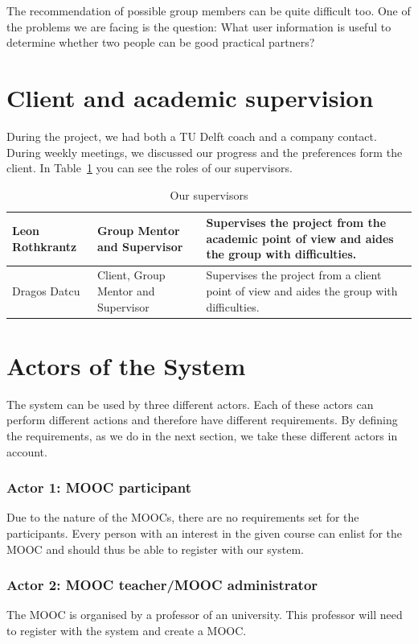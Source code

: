 The recommendation of possible group members can be quite difficult too.
One of the problems we are facing is the question: What user information is useful to determine whether two people can be good practical partners?

\section{Client and academic supervision}
During the project, we had both a TU Delft coach and a company contact.
During weekly meetings, we discussed our progress and the preferences form the client.
In Table~\ref{supervision} you can see the roles of our supervisors.

\begin{table}[H]
\begin{tabular}{ | p{3cm} | p{5cm} | p{6cm} | }
 \hline
Leon Rothkrantz & Group Mentor and Supervisor & Supervises the project from the academic point of view and aides the group with difficulties.\\ \hline
Dragos Datcu &  Client, Group Mentor and Supervisor & Supervises the project from a client point of view and aides the group with difficulties.\\
\hline
\end{tabular}
\caption{Our supervisors}
\label{supervision}
\end{table}

\section{Actors of the System}
The system can be used by three different actors.
Each of these actors can perform different actions and therefore have different requirements.
By defining the requirements, as we do in the next section, we take these different actors in account.

\subsubsection{Actor 1: MOOC participant}
Due to the nature of the MOOCs, there are no requirements set for the participants.
Every person with an interest in the given course can enlist for the MOOC and should thus be able to register with our system.
\subsubsection{Actor 2: MOOC teacher/MOOC administrator} 
The MOOC is organised by a professor of an university.
This professor will need to register with the system and create a MOOC.
